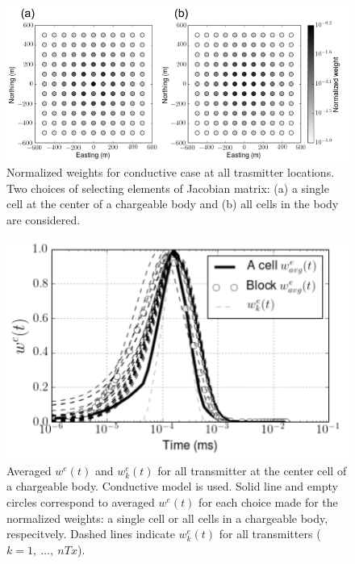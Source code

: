 \documentclass[a4paper, 11pt]{article}
\begin{document}
\begin{figure}[htb]
  \centering
  \includegraphics[width=1.\textwidth]{figures/NormalizedWeights.png}
  \caption{Normalized weights for conductive case at all trasmitter locations. Two choices of selecting elements of Jacobian matrix: (a) a single cell at the center of a chargeable body and (b) all cells in the body are considered. }
  \label{F:NormalizedWeights}
\end{figure}

\begin{figure}[htb]
  \centering
  \includegraphics[width=1.\textwidth]{figures/AveragedWe.png}
  \caption{Averaged $w^e(t)$ and $w^e_k(t)$ for all transmitter at the center cell of a chargeable body. Conductive model is used. Solid line and empty circles correspond to averaged $w^e(t)$ for each choice made for the normalized weights: a single cell or all cells in a chargeable body, respecitvely. Dashed lines indicate $w^e_k(t)$ for all transmitters ($k=1,\ \ldots,\ nTx$).}
  \label{F:AveragedWe}
\end{figure}
\clearpage
\end{document}
